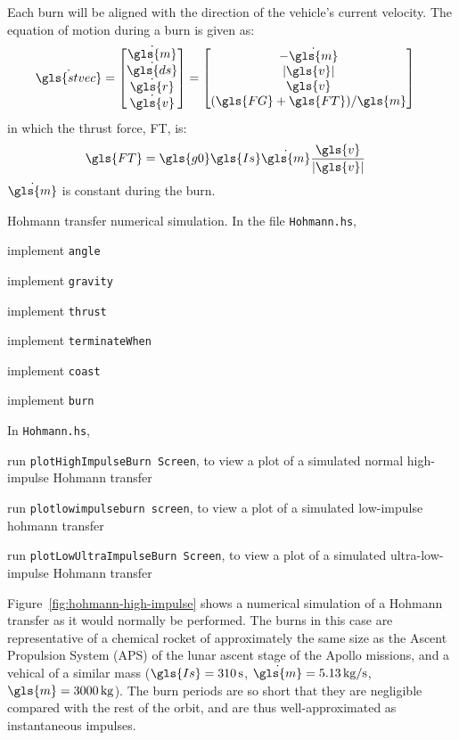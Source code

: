 \documentclass[12pt,openany]{book}
\newcommand{\filename}[1]{\texttt{#1}}  %
\newcommand{\code}[1]{\texttt{#1}}      %
\begin{document}
Each burn will be aligned with the direction of the vehicle's current velocity. The equation of motion during a burn is given as:
\begin{align}
  \dot{\gls{stvec}}
  = \begin{bmatrix}\dot{\gls{m}}\\\dot{\gls{ds}}\\\dot{\gls{r}}\\\dot{\gls{v}}\end{bmatrix}
  &= \begin{bmatrix}
    -\dot{\gls{m}} \\
    |\gls{v}| \\
    \gls{v} \\
    (\gls{FG} + \gls{FT})/\gls{m}
  \end{bmatrix}
\end{align}
in which the thrust force, \gls{FT}, is:
\begin{align}
  \gls{FT} &= \gls{g0}\gls{Is}\dot{\gls{m}} \frac{\gls{v}}{|\gls{v}|}
\end{align}
\(\dot{\gls{m}}\) is constant during the burn.

\begin{problem}[label=hohmann]{Hohmann transfer numerical simulation.}
  In the file \filename{Hohmann.hs},
  \begin{probitemize}
  \item implement \code{angle}
  \item implement \code{gravity}
  \item implement \code{thrust}
  \item implement \code{terminateWhen}
  \item implement \code{coast}
  \item implement \code{burn}
  \end{probitemize}
  In \filename{Hohmann.hs},
  \begin{probitemize}
  \item run \code{plotHighImpulseBurn Screen}, to view a plot of a simulated normal high-impulse Hohmann transfer
  \item run \code{plotlowimpulseburn screen}, to view a plot of a simulated low-impulse hohmann transfer
  \item run \code{plotLowUltraImpulseBurn Screen}, to view a plot of a simulated ultra-low-impulse Hohmann transfer
  \end{probitemize}
\end{problem}

Figure~\ref{fig:hohmann-high-impulse} shows a numerical simulation of a Hohmann transfer as it would normally be performed. The burns in this case are representative of a chemical rocket of approximately the same size as the Ascent Propulsion System (APS) of the lunar ascent stage of the Apollo missions, and a vehical of a similar mass (\(\gls{Is}=\SI{310}{s}\), \(\dot{\gls{m}}=\SI{5.13}{kg\per\s}\), \(\gls{m}=\SI{3000}{kg}\)). The burn periods are so short that they are negligible compared with the rest of the orbit, and are thus well-approximated as instantaneous impulses.
\end{document}
